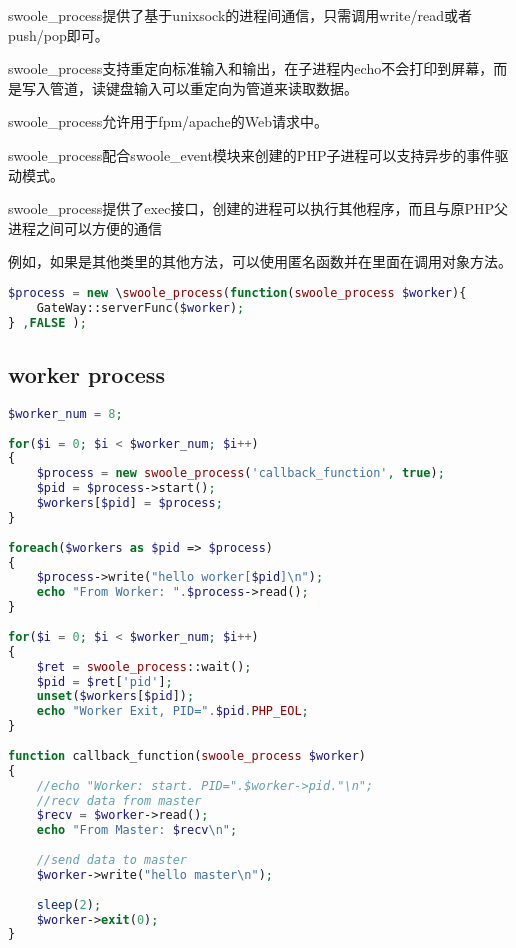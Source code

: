 \begin{compactitem}
\item swoole\_process提供了基于unixsock的进程间通信，只需调用write/read或者push/pop即可。
\item swoole\_process支持重定向标准输入和输出，在子进程内echo不会打印到屏幕，而是写入管道，读键盘输入可以重定向为管道来读取数据。
\item swoole\_process允许用于fpm/apache的Web请求中。

\item swoole\_process配合swoole\_event模块来创建的PHP子进程可以支持异步的事件驱动模式。
\item swoole\_process提供了exec接口，创建的进程可以执行其他程序，而且与原PHP父进程之间可以方便的通信 
\end{compactitem}

例如，如果是其他类里的其他方法，可以使用匿名函数并在里面在调用对象方法。

\begin{lstlisting}[language=PHP]
$process = new \swoole_process(function(swoole_process $worker){
	GateWay::serverFunc($worker);
} ,FALSE );　
\end{lstlisting}


\subsection{worker process}


\begin{lstlisting}[language=PHP]
$worker_num = 8;
 
for($i = 0; $i < $worker_num; $i++)
{
    $process = new swoole_process('callback_function', true);
    $pid = $process->start();
    $workers[$pid] = $process;
}
 
foreach($workers as $pid => $process)
{
    $process->write("hello worker[$pid]\n");
    echo "From Worker: ".$process->read();
}
 
for($i = 0; $i < $worker_num; $i++)
{
    $ret = swoole_process::wait();
    $pid = $ret['pid'];
    unset($workers[$pid]);
    echo "Worker Exit, PID=".$pid.PHP_EOL;
}
 
function callback_function(swoole_process $worker)
{
    //echo "Worker: start. PID=".$worker->pid."\n";
    //recv data from master
    $recv = $worker->read();
    echo "From Master: $recv\n";
 
    //send data to master
    $worker->write("hello master\n");
 
    sleep(2);
    $worker->exit(0);
}
\end{lstlisting}


